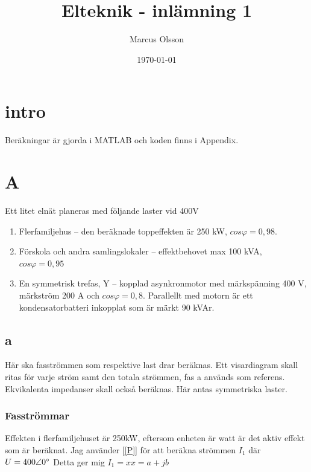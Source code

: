\documentclass{article}
\title{Elteknik - inlämning 1} %
\author{
	\begin{tabular}{l r}
    Marcus Olsson \\
    \\
    \end{tabular}
    }
\date{\today} %
\begin{document}
\maketitle %
\tableofcontents
\clearpage
\section{intro}
Beräkningar är gjorda i MATLAB och koden finns i Appendix.

\section{A}
Ett litet elnät planeras med följande laster vid 400V

\begin{enumerate}
	\item Flerfamiljehus – den beräknade toppeffekten är 250 kW, $cos\varphi = 0,98$.
	\item Förskola och andra samlingslokaler – effektbehovet max 100 kVA, $cos\varphi = 0,95$
	\item En symmetrisk trefas, Y – kopplad asynkronmotor med märkspänning 400 V,
märkström 200 A och $cos\varphi = 0,8$. Parallellt med motorn är ett kondensatorbatteri
inkopplat som är märkt 90 kVAr.
\end{enumerate}

\subsection{a}
Här ska fasströmmen som respektive last drar beräknas.
Ett visardiagram skall ritas för varje ström samt den totala strömmen, fas a används som referens.
Ekvikalenta impedanser skall också beräknas.
Här antas symmetriska laster.

  \subsubsection{Fasströmmar}
  Effekten i flerfamiljehuset är 250kW, eftersom enheten är watt är det aktiv effekt som är beräknat.
  Jag använder [\ref{P}] för att beräkna strömmen $I_1$ där $U=400\angle{0\degree}$
  Detta ger mig $I_1=xx=a+jb$
\end{document}
